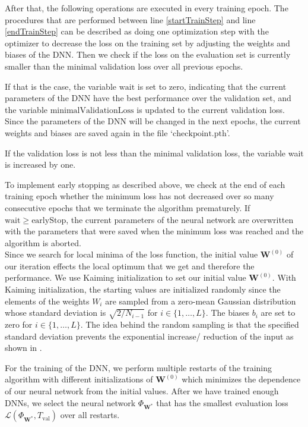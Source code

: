 After that, the following operations are executed in every training epoch. The procedures that are performed between line \ref{startTrainStep} and line \ref{endTrainStep} can be described as doing one optimization step with the $\mathrm{optimizer}$ to decrease the loss on the training set by adjusting the weights and biases of the DNN. Then we check if the loss on the evaluation set is currently smaller than the minimal validation loss over all previous epochs.

If that is the case, the variable $\mathrm{wait}$ is set to zero, indicating that the current parameters of the DNN have the best performance over the validation set, and the variable $\mathrm{minimalValidationLoss}$ is updated to the current validation loss. Since the parameters of the DNN will be changed in the next epochs, the current weights and biases are saved again in the file `$\mathrm{checkpoint.pth}$'.

If the validation loss is not less than the minimal validation loss, the variable wait is increased by one.

To implement early stopping as described above, we check at the end of each training epoch whether the minimum loss has not decreased over so many consecutive epochs that we terminate the algorithm prematurely. If $\mathrm{wait} \geq \mathrm{earlyStop}$, the current parameters of the neural network are overwritten with the parameters that were saved when the minimum loss was reached and the algorithm is aborted.\\

Since we search for local minima of the loss function, the initial value $\mathbf{W}^{(0)}$ of our iteration effects the local optimum that we get and therefore the performance. We use Kaiming initialization \cite{7410480} to set our initial value $\mathbf{W}^{(0)}$. With Kaiming initialization, the starting values are initialized randomly since the elements of the weights $W_i$ are sampled from a zero-mean Gaussian distribution whose standard deviation is $\sqrt{2/N_{i-1}}$ for $i\in\{1,\dotsc,L\}$. The biases $b_i$ are set to zero for $i\in\{1,\dotsc,L\}$. The idea behind the random sampling is that the specified standard deviation prevents the exponential increase/ reduction of the input as shown in \cite{7410480}.

For the training of the DNN, we perform multiple restarts of the training algorithm with different initializations of $\mathbf{W}^{(0)}$ which minimizes the dependence of our neural network from the initial values. After we have trained enough DNNs, we select the neural network $\Phi_{\mathbf{W}^*}$ that has the smallest evaluation loss $\mathscr{L}(\Phi_{\mathbf{W}^*},T_\mathrm{val})$ over all restarts.

